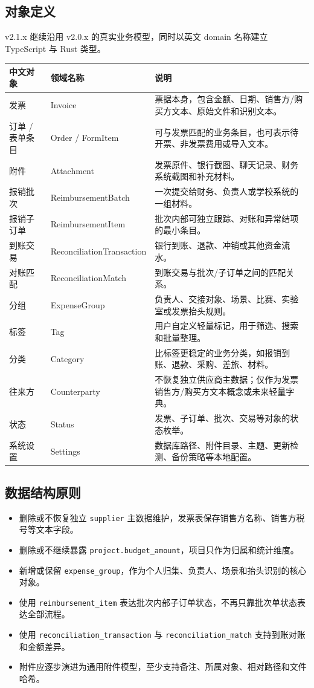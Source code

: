 \documentclass[UTF8,zihao=-4]{ctexart}
\begin{document}
\subsection{对象定义}

v2.1.x 继续沿用 v2.0.x 的真实业务模型，同时以英文 domain 名称建立 TypeScript 与 Rust 类型。

\begin{longtable}{p{3.2cm}p{4.0cm}p{7.2cm}}
\toprule
中文对象 & 领域名称 & 说明 \\
\midrule
发票 & Invoice & 票据本身，包含金额、日期、销售方/购买方文本、原始文件和识别文本。 \\
订单 / 表单条目 & Order / FormItem & 可与发票匹配的业务条目，也可表示待开票、非发票费用或导入文本。 \\
附件 & Attachment & 发票原件、银行截图、聊天记录、财务系统截图和补充材料。 \\
报销批次 & ReimbursementBatch & 一次提交给财务、负责人或学校系统的一组材料。 \\
报销子订单 & ReimbursementItem & 批次内部可独立跟踪、对账和异常结项的最小条目。 \\
到账交易 & ReconciliationTransaction & 银行到账、退款、冲销或其他资金流水。 \\
对账匹配 & ReconciliationMatch & 到账交易与批次/子订单之间的匹配关系。 \\
分组 & ExpenseGroup & 负责人、交接对象、场景、比赛、实验室或发票抬头规则。 \\
标签 & Tag & 用户自定义轻量标记，用于筛选、搜索和批量整理。 \\
分类 & Category & 比标签更稳定的业务分类，如报销到账、退款、采购、差旅、材料。 \\
往来方 & Counterparty & 不恢复独立供应商主数据；仅作为发票销售方/购买方文本概念或未来轻量字典。 \\
状态 & Status & 发票、子订单、批次、交易等对象的状态枚举。 \\
系统设置 & Settings & 数据库路径、附件目录、主题、更新检测、备份策略等本地配置。 \\
\bottomrule
\end{longtable}

\subsection{数据结构原则}

\begin{itemize}
  \item 删除或不恢复独立 \texttt{supplier} 主数据维护，发票表保存销售方名称、销售方税号等文本字段。
  \item 删除或不继续暴露 \texttt{project.budget\_amount}，项目只作为归属和统计维度。
  \item 新增或保留 \texttt{expense\_group}，作为个人归集、负责人、场景和抬头识别的核心对象。
  \item 使用 \texttt{reimbursement\_item} 表达批次内部子订单状态，不再只靠批次单状态表达全部流程。
  \item 使用 \texttt{reconciliation\_transaction} 与 \texttt{reconciliation\_match} 支持到账对账和金额差异。
  \item 附件应逐步演进为通用附件模型，至少支持备注、所属对象、相对路径和文件哈希。
\end{itemize}
\end{document}
